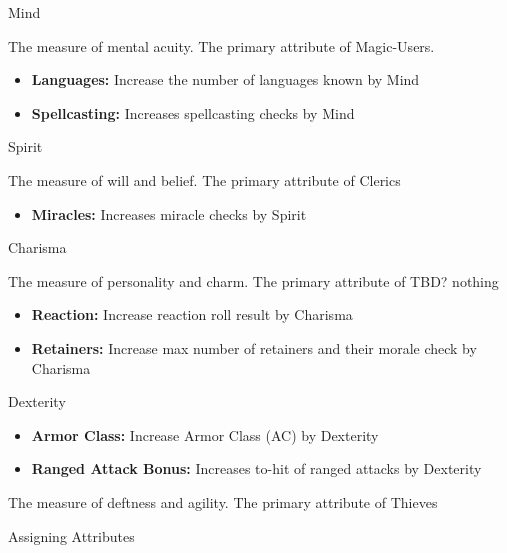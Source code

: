\documentclass[18pt]{article}
\begin{document}
\begin{multicols}{2}
\begin{mercHeading}
Mind
\end{mercHeading}
The measure of mental acuity. The primary attribute of Magic-Users.

\begin{itemize}
\setlength\itemsep{0em}
	\item \textbf{Languages:} Increase the number of languages known by Mind
	\item \textbf{Spellcasting:} Increases spellcasting checks by Mind
\end{itemize}

\begin{mercHeading}
Spirit
\end{mercHeading}
The measure of will and belief. The primary attribute of Clerics

\begin{itemize}
\setlength\itemsep{0em}
	\item \textbf{Miracles:} Increases miracle checks by Spirit
\end{itemize}

\begin{mercHeading}
Charisma
\end{mercHeading}
The measure of personality and charm. The primary attribute of TBD? nothing

\begin{itemize}
\setlength\itemsep{0em}
	\item \textbf{Reaction:} Increase reaction roll result by Charisma
	\item \textbf{Retainers:} Increase max number of retainers and their morale check by Charisma
\end{itemize}

\begin{mercHeading}
Dexterity
\end{mercHeading}

\begin{itemize}
\setlength\itemsep{0em}
	\item \textbf{Armor Class:} Increase Armor Class (AC) by Dexterity
	\item \textbf{Ranged Attack Bonus:} Increases to-hit of ranged attacks by Dexterity
\end{itemize}
The measure of deftness and agility. The primary attribute of Thieves

\begin{mercHeading}
Assigning Attributes
\end{mercHeading}


\end{multicols}
\end{document}
